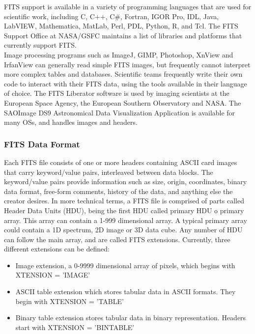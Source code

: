 FITS support is available in a variety of programming languages that are used for scientific work, including C, C++, C\#, Fortran, IGOR Pro, IDL, Java, LabVIEW, Mathematica, MatLab, Perl, PDL, Python, R, and Tcl. The FITS Support Office at NASA/GSFC maintains a list of libraries and platforms that currently support FITS.\\
 
Image processing programs such as ImageJ, GIMP, Photoshop, XnView and IrfanView can generally read simple FITS images, but frequently cannot interpret more complex tables and databases. Scientific teams frequently write their own code to interact with their FITS data, using the tools available in their language of choice. The FITS Liberator software is used by imaging scientists at the European Space Agency, the European Southern Observatory and NASA. The SAOImage DS9 Astronomical Data Visualization Application is available for many OSs, and handles images and headers.

\subsubsection{FITS Data Format}

Each FITS file consists of one or more headers containing ASCII card images that carry keyword/value pairs, interleaved between data blocks. The keyword/value pairs provide information such as size, origin, coordinates, binary data format, free-form comments, history of the data, and anything else the creator desires. In more technical terms, a FITS file is comprised of parts called Header Data Units (HDU), being the first HDU called primary HDU o primary array. This array can contain a 1-999 dimensional array. A typical primary array could contain a 1D spectrum, 2D image or 3D data cube. Any number of HDU can follow the main array, and are called FITS extensions. Currently, three different extensions can be defined:

\begin{itemize}
\item Image extension, a 0-9999 dimensional array of pixels, which begins with XTENSION = 'IMAGE'
\item ASCII table extension which stores tabular data in ASCII formats. They begin with XTENSION = 'TABLE'
\item Binary table extension stores tabular data in binary representation. Headers start with XTENSION = 'BINTABLE'
\end{itemize}

